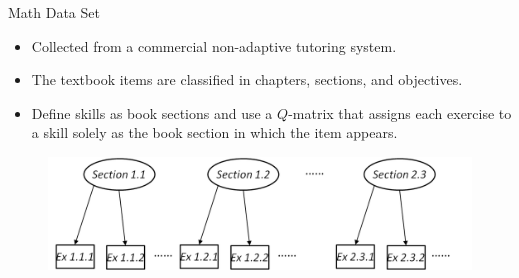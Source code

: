 \documentclass[hyperref={pdfpagelabels=false}]{beamer}
\begin{document}
\begin{frame}{Math Data Set}
	\begin{itemize}\small 
		\item Collected from a commercial non-adaptive tutoring system.
		\item The textbook items are classified in chapters, sections, and objectives.
		\item Define skills as book sections and use a $Q$-matrix that assigns each exercise to a skill solely as the book section in which the item appears.
	\end{itemize}

				\begin{figure}[!th]
						\centering
						\includegraphics[width=0.9\linewidth]{figures/mathdataset.png}
				\end{figure}	
	
\end{frame}
\end{document}
